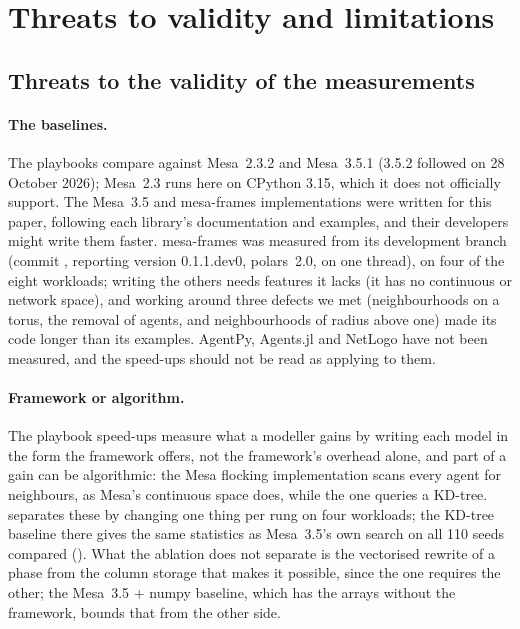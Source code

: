 \section{Threats to validity and limitations}
\label{sec:threats}

\subsection{Threats to the validity of the measurements}

\paragraph{The baselines.} The playbooks compare against Mesa~2.3.2 and Mesa~3.5.1 (3.5.2 followed on 28 October 2026); Mesa~2.3 runs here on CPython
3.15, which it does not officially support. The Mesa~3.5 and mesa-frames implementations were
written for this paper, following each library's documentation and examples, and their
developers might write them faster. mesa-frames was measured from its development branch
(commit , reporting version 0.1.1.dev0, polars~2.0, on one thread), on four of the eight workloads; writing
the others needs features it lacks (it has no continuous or network space), and working
around three defects we met (neighbourhoods on a torus, the removal of agents, and
neighbourhoods of radius above one) made its code longer than its examples. AgentPy,
Agents.jl and NetLogo have not been measured, and the speed-ups should not be read as applying
to them.

\paragraph{Framework or algorithm.} The playbook speed-ups measure what a modeller gains by
writing each model in the form the framework offers, not the framework's overhead alone, and
part of a gain can be algorithmic: the Mesa flocking implementation scans every agent for
neighbours, as Mesa's continuous space does, while the \modelly{} one queries a KD-tree.
 separates these by changing one thing per rung on four workloads; the
KD-tree baseline there gives the same statistics as Mesa~3.5's own search on all 110 seeds
compared (). What the ablation does not separate is
the vectorised rewrite of a phase from the column storage that makes it possible, since the
one requires the other; the Mesa~3.5 + numpy baseline, which has the arrays without the
framework, bounds that from the other side.

